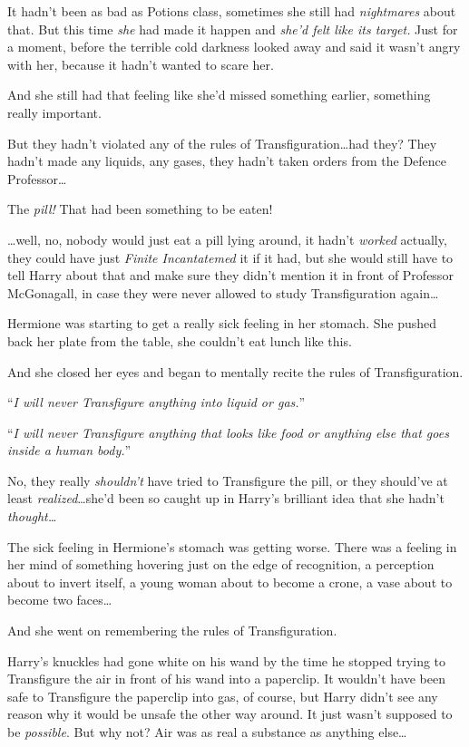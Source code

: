 It hadn’t been as bad as Potions class, sometimes she still had \emph{nightmares} about that. But this time \emph{she} had made it happen and \emph{she’d felt like its target.} Just for a moment, before the terrible cold darkness looked away and said it wasn’t angry with her, because it hadn’t wanted to scare her.

And she still had that feeling like she’d missed something earlier, something really important.

But they hadn’t violated any of the rules of Transfiguration…had they? They hadn’t made any liquids, any gases, they hadn’t taken orders from the Defence Professor…

The \emph{pill!} That had been something to be eaten!

…well, no, nobody would just eat a pill lying around, it hadn’t \emph{worked} actually, they could have just \emph{Finite Incantatemed} it if it had, but she would still have to tell Harry about that and make sure they didn’t mention it in front of Professor McGonagall, in case they were never allowed to study Transfiguration again…

Hermione was starting to get a really sick feeling in her stomach. She pushed back her plate from the table, she couldn’t eat lunch like this.

And she closed her eyes and began to mentally recite the rules of Transfiguration.

“\emph{I will never Transfigure anything into liquid or gas.}”

“\emph{I will never Transfigure anything that looks like food or anything else that goes inside a human body.}”

No, they really \emph{shouldn’t} have tried to Transfigure the pill, or they should’ve at least \emph{realized}…she’d been so caught up in Harry’s brilliant idea that she hadn’t \emph{thought…}

The sick feeling in Hermione’s stomach was getting worse. There was a feeling in her mind of something hovering just on the edge of recognition, a perception about to invert itself, a young woman about to become a crone, a vase about to become two faces…

And she went on remembering the rules of Transfiguration.

\later

Harry’s knuckles had gone white on his wand by the time he stopped trying to Transfigure the air in front of his wand into a paperclip. It wouldn’t have been safe to Transfigure the paperclip into gas, of course, but Harry didn’t see any reason why it would be unsafe the other way around. It just wasn’t supposed to be \emph{possible}. But why not? Air was as real a substance as anything else…

